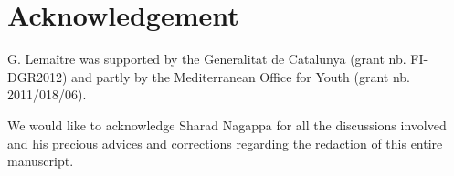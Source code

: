 \section{Acknowledgement} \label{sec:acknowledgement}

G. Lema\^itre was supported by the Generalitat de Catalunya (grant nb. FI-DGR2012) and partly by the Mediterranean Office for Youth (grant nb. 2011/018/06).

We would like to acknowledge Sharad Nagappa for all the discussions involved and his precious advices and corrections regarding the redaction of this entire manuscript.